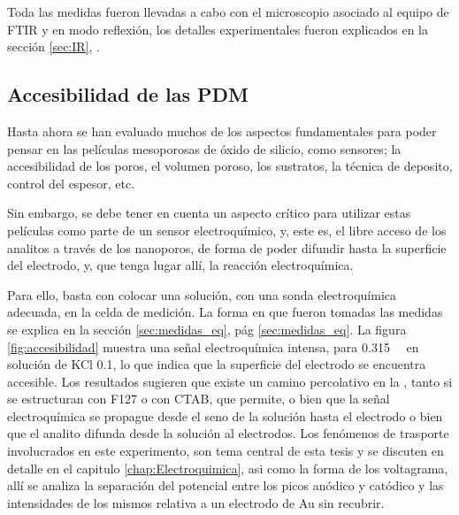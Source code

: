 		Toda las medidas fueron llevadas a cabo con el microscopio asociado al equipo de FTIR y en modo reflexión, los detalles experimentales fueron explicados en la sección \ref{sec:IR}, \pageref{sec:IR}. %


	\subsection{Accesibilidad de las PDM}

			Hasta ahora se han evaluado muchos de los aspectos fundamentales para poder pensar en las películas mesoporosas de óxido de silicio, como sensores; la accesibilidad de los poros, el volumen poroso, los sustratos, la técnica de deposito, control del espesor, etc. 

			Sin embargo, se debe tener en cuenta un aspecto crítico para utilizar estas películas como parte de un sensor electroquímico, y, este es, el libre acceso de los analitos a través de los nanoporos, de forma de poder difundir hasta la superficie del electrodo, y, que tenga lugar allí, la reacción electroquímica.

			Para ello, basta con colocar una solución, con una sonda electroquímica adecuada, en la celda de medición. La forma en que fueron tomadas las medidas se explica en la sección \ref{sec:medidas_eq}, pág \ref{sec:medidas_eq}. La figura \ref{fig:accesibilidad} muestra una señal electroquímica intensa, para \aminorutenio\space \SI{0.315}{\milli\Molar} en solución de KCl \SI{0.1}{\Molar}, lo que indica que la superficie del electrodo se encuentra accesible. Los resultados sugieren que existe un camino percolativo en la \pdm, tanto si se estructuran con F127 o con CTAB, que permite, o bien que la señal electroquímica se propague desde el seno de la solución hasta el electrodo o bien que el analito difunda desde la solución al electrodos.   Los fenómenos de trasporte involucrados en este experimento, son tema central de esta tesis y se discuten en detalle en el capitulo \ref{chap:Electroquimica}, asi como la forma de los voltagrama, allí se analiza la separación del potencial entre los picos anódico y catódico y las intensidades de los mismos relativa a un electrodo de Au sin recubrir. 

